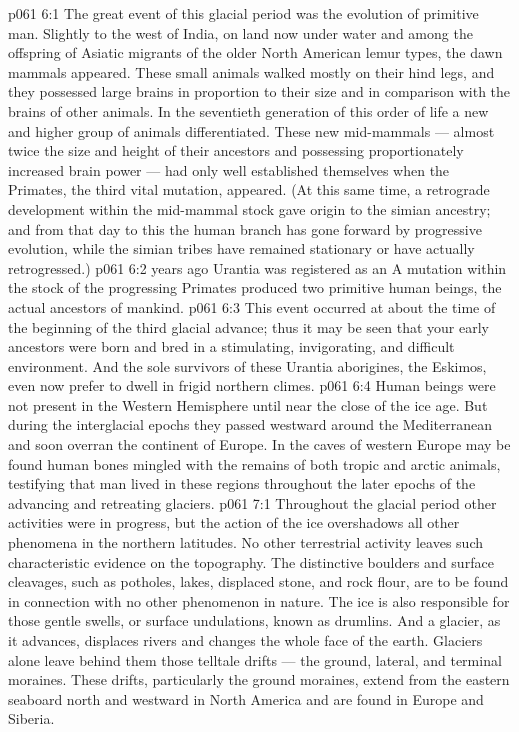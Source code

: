 \vs p061 6:1 The great event of this glacial period was the evolution of primitive man. Slightly to the west of India, on land now under water and among the offspring of Asiatic migrants of the older North American lemur types, the dawn mammals  appeared. These small animals walked mostly on their hind legs, and they possessed large brains in proportion to their size and in comparison with the brains of other animals. In the seventieth generation of this order of life a new and higher group of animals  differentiated. These new mid\hyp{}mammals --- almost twice the size and height of their ancestors and possessing proportionately increased brain power --- had only well established themselves when the Primates, the third vital mutation,  appeared. (At this same time, a retrograde development within the mid\hyp{}mammal stock gave origin to the simian ancestry; and from that day to this the human branch has gone forward by progressive evolution, while the simian tribes have remained stationary or have actually retrogressed.)
\vs p061 6:2 \pc {} years ago Urantia was registered as an  A mutation within the stock of the progressing Primates  produced two primitive human beings, the actual ancestors of mankind.
\vs p061 6:3 This event occurred at about the time of the beginning of the third glacial advance; thus it may be seen that your early ancestors were born and bred in a stimulating, invigorating, and difficult environment. And the sole survivors of these Urantia aborigines, the Eskimos, even now prefer to dwell in frigid northern climes.
\vs p061 6:4 \pc Human beings were not present in the Western Hemisphere until near the close of the ice age. But during the interglacial epochs they passed westward around the Mediterranean and soon overran the continent of Europe. In the caves of western Europe may be found human bones mingled with the remains of both tropic and arctic animals, testifying that man lived in these regions throughout the later epochs of the advancing and retreating glaciers.
\vs p061 7:1 Throughout the glacial period other activities were in progress, but the action of the ice overshadows all other phenomena in the northern latitudes. No other terrestrial activity leaves such characteristic evidence on the topography. The distinctive boulders and surface cleavages, such as potholes, lakes, displaced stone, and rock flour, are to be found in connection with no other phenomenon in nature. The ice is also responsible for those gentle swells, or surface undulations, known as drumlins. And a glacier, as it advances, displaces rivers and changes the whole face of the earth. Glaciers alone leave behind them those telltale drifts --- the ground, lateral, and terminal moraines. These drifts, particularly the ground moraines, extend from the eastern seaboard north and westward in North America and are found in Europe and Siberia.
